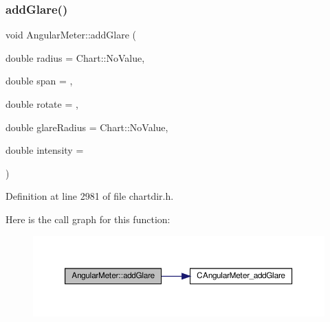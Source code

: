 \subsubsection{\texorpdfstring{add\+Glare()}{addGlare()}}
{\footnotesize\ttfamily void Angular\+Meter\+::add\+Glare (\begin{DoxyParamCaption}\item[{double}]{radius = {\ttfamily Chart\+:\+:NoValue},  }\item[{double}]{span = {},  }\item[{double}]{rotate = {},  }\item[{double}]{glare\+Radius = {\ttfamily Chart\+:\+:NoValue},  }\item[{double}]{intensity = {} }\end{DoxyParamCaption})\hspace{0.3cm}{\ttfamily [inline]}}



Definition at line 2981 of file chartdir.\+h.

Here is the call graph for this function\+:
\nopagebreak
\begin{figure}[H]
\begin{center}
\leavevmode
\includegraphics[width=350pt]{class_angular_meter_ade95bcd716c78e650ab625c3b6c0fa0c_cgraph}
\end{center}
\end{figure}
\mbox{\label{class_angular_meter_a50942d4bfc5e84f9532784e6d41c9ec1}} 
